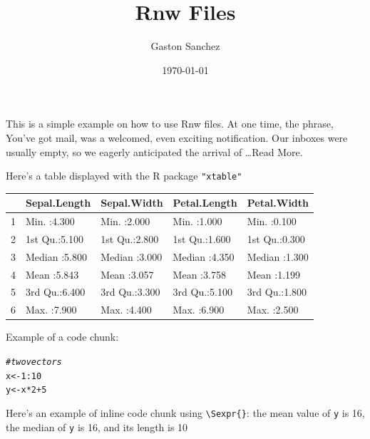 \documentclass[12pt]{article}\usepackage[]{graphicx}\usepackage[]{color}
\title{Rnw Files}
\author{Gaston Sanchez}
\date{\today}
\makeatletter
\newcommand{\hlnum}[1]{\textcolor[rgb]{0.686,0.059,0.569}{#1}}%
\newcommand{\hlcom}[1]{\textcolor[rgb]{0.678,0.584,0.686}{\textit{#1}}}%
\newcommand{\hlopt}[1]{\textcolor[rgb]{0,0,0}{#1}}%
\newcommand{\hlstd}[1]{\textcolor[rgb]{0.345,0.345,0.345}{#1}}%
\newcommand{\hlkwb}[1]{\textcolor[rgb]{0.69,0.353,0.396}{#1}}%
\newenvironment{kframe}{%
 \def\at@end@of@kframe{}%
 \ifinner\ifhmode%
  \def\at@end@of@kframe{\end{minipage}}%
  \begin{minipage}{\columnwidth}%
 \fi\fi%
 \def\FrameCommand##1{\hskip\@totalleftmargin \hskip-\fboxsep
 \colorbox{shadecolor}{##1}\hskip-\fboxsep
     \hskip-\linewidth \hskip-\@totalleftmargin \hskip\columnwidth}%
 \MakeFramed {\advance\hsize-\width
   \@totalleftmargin\z@ \linewidth\hsize
   \@setminipage}}%
 {\par\unskip\endMakeFramed%
 \at@end@of@kframe}
\newenvironment{knitrout}{}{} %
\makeatother
\begin{document}
\maketitle

\noindent This is a simple example on how to use Rnw files. At one time, the phrase, You've got mail, was a welcomed, even exciting notification. Our inboxes were usually empty, so we eagerly anticipated the arrival of \dots Read More.

Here's a table displayed with the R package \texttt{"xtable"}

\begin{table}[ht]
\centering
\begin{tabular}{rllll}
  \hline
 &  Sepal.Length &  Sepal.Width &  Petal.Length &  Petal.Width \\ 
  \hline
1 & Min.   :4.300   & Min.   :2.000   & Min.   :1.000   & Min.   :0.100   \\ 
  2 & 1st Qu.:5.100   & 1st Qu.:2.800   & 1st Qu.:1.600   & 1st Qu.:0.300   \\ 
  3 & Median :5.800   & Median :3.000   & Median :4.350   & Median :1.300   \\ 
  4 & Mean   :5.843   & Mean   :3.057   & Mean   :3.758   & Mean   :1.199   \\ 
  5 & 3rd Qu.:6.400   & 3rd Qu.:3.300   & 3rd Qu.:5.100   & 3rd Qu.:1.800   \\ 
  6 & Max.   :7.900   & Max.   :4.400   & Max.   :6.900   & Max.   :2.500   \\ 
   \hline
\end{tabular}
\end{table}


Example of a code chunk:
\begin{knitrout}
\color{fgcolor}\begin{kframe}
\begin{alltt}
\hlcom{# two vectors}
\hlstd{x} \hlkwb{<-} \hlnum{1}\hlopt{:}\hlnum{10}
\hlstd{y} \hlkwb{<-} \hlstd{x}\hlopt{*}\hlnum{2} \hlopt{+} \hlnum{5}
\end{alltt}
\end{kframe}
\end{knitrout}

Here's an example of inline code chunk using \texttt{\textbackslash Sexpr\{\}}: the mean value of \texttt{y} is 16, the median of \texttt{y} is 16, and its length is 10
\end{document}
